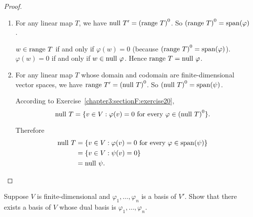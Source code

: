 \begin{proof}
    \begin{enumerate}[label={(\alph*)}]
        \item For any linear map $T$, we have $\operatorname{null}\,{T'} = {(\operatorname{range}\,{T})}^{0}$. So ${(\operatorname{range}\,{T})}^{0} = \operatorname{span}(\varphi)$.

              $w\in \operatorname{range}\,{T}$ if and only if $\varphi(w) = 0$ (because ${(\operatorname{range}\,{T})}^{0} = \operatorname{span}(\varphi)$). $\varphi(w) = 0$ if and only if $w\in\operatorname{null}\,{\varphi}$. Hence $\operatorname{range}\,{T} = \operatorname{null}\,{\varphi}$.

        \item For any linear map $T$ whose domain and codomain are finite-dimensional vector spaces, we have $\operatorname{range}\,{T'} = {(\operatorname{null}\,{T})}^{0}$. So ${(\operatorname{null}\,{T})}^{0} = \operatorname{span}(\psi)$.

              According to Exercise~\ref{chapter3:sectionF:exercise20},
              \[
                  \operatorname{null}\,{T} = \{ v\in V: \varphi(v) = 0 \text{ for every $\varphi\in{(\operatorname{null}\,{T})}^{0}$} \}.
              \]

              Therefore
              \begin{align*}
                  \operatorname{null}\,{T} & = \{ v\in V: \varphi(v) = 0 \text{ for every $\varphi\in\operatorname{span}(\psi)$} \} \\
                             & = \{ v\in V: \psi(v) = 0 \}                                                            \\
                             & = \operatorname{null}\,{\psi}.\qedhere
              \end{align*}
    \end{enumerate}
\end{proof}
\newpage

\begin{exercise}\label{chapter3:sectionF:exercise30}
    Suppose $V$ is finite-dimensional and $\varphi_{1}, \ldots, \varphi_{n}$ is a basis of $V'$. Show that there exists a basis of $V$ whose dual basis is $\varphi_{1}, \ldots, \varphi_{n}$.
\end{exercise}

